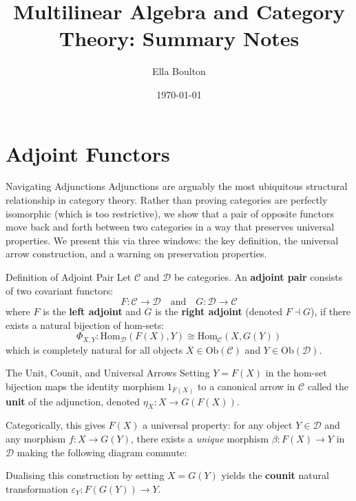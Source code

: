 \documentclass[10pt,a4paper]{article}
\title{\textbf{Multilinear Algebra and Category Theory: Summary Notes}}
\author{Ella Boulton}
\date{\today}
\theoremstyle{definition}
\begin{document}
	
	\maketitle
	\tableofcontents
	\newpage
	
	
	
	\section{Adjoint Functors}
	
	\begin{roadmap}{Navigating Adjunctions}
		Adjunctions are arguably the most ubiquitous structural relationship in category theory. Rather than proving categories are perfectly isomorphic (which is too restrictive), we show that a pair of opposite functors move back and forth between two categories in a way that preserves universal properties. We present this via three windows: the key definition, the universal arrow construction, and a warning on preservation properties.
	\end{roadmap}
	
	\begin{keyidea}{Definition of Adjoint Pair}
		Let $\mathcal{C}$ and $\mathcal{D}$ be categories. An \textbf{adjoint pair} consists of two covariant functors:
		\[ F: \mathcal{C} \longrightarrow \mathcal{D} \quad \text{and} \quad G: \mathcal{D} \longrightarrow \mathcal{C} \]
		where $F$ is the \textbf{left adjoint} and $G$ is the \textbf{right adjoint} (denoted $F \dashv G$), if there exists a natural bijection of hom-sets:
		\[ \Phi_{X,Y}: \text{Hom}_{\mathcal{D}}(F(X), Y) \cong \text{Hom}_{\mathcal{C}}(X, G(Y)) \]
		which is completely natural for all objects $X \in \text{Ob}(\mathcal{C})$ and $Y \in \text{Ob}(\mathcal{D})$.
	\end{keyidea}
	
	\begin{categorical}{The Unit, Counit, and Universal Arrows}
		Setting $Y = F(X)$ in the hom-set bijection maps the identity morphism $1_{F(X)}$ to a canonical arrow in $\mathcal{C}$ called the \textbf{unit} of the adjunction, denoted $\eta_X: X \to G(F(X))$. 
		
		Categorically, this gives $F(X)$ a universal property: for any object $Y \in \mathcal{D}$ and any morphism $f: X \to G(Y)$, there exists a \textit{unique} morphism $\beta: F(X) \to Y$ in $\mathcal{D}$ making the following diagram commute:
		\begin{center}
		\end{center}
		Dualising this construction by setting $X = G(Y)$ yields the \textbf{counit} natural transformation $\varepsilon_Y: F(G(Y)) \to Y$.
	\end{categorical}
	
\end{document}
